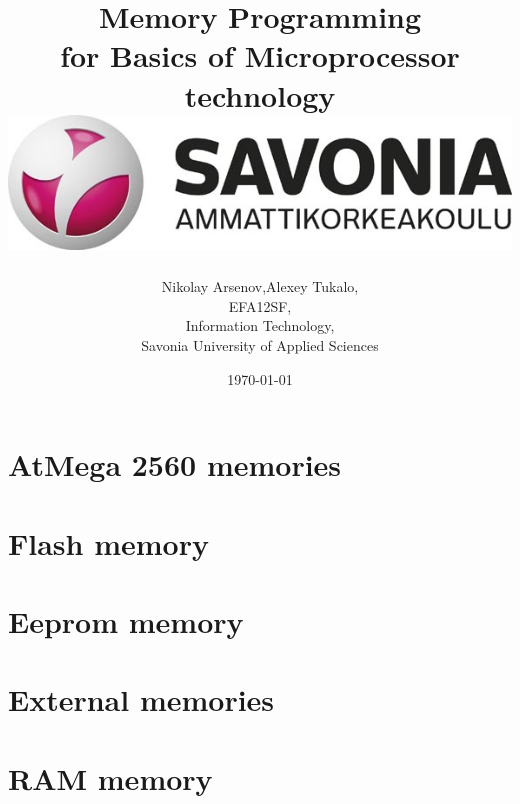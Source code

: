 \documentclass[english]{article}
\date{}
\begin{document}
\title{\vspace{2in}Memory Programming\\
\small for Basics of Microprocessor technology\\
\vspace{0.5in}\includegraphics{savonia.jpg}}

\nopagebreak
\maketitle


\vspace{3in}

\author{
\begin{flushright}
Nikolay Arsenov,Alexey Tukalo,\\
EFA12SF,\\
Information Technology,\\
Savonia University of Applied Sciences
\end{flushright}
}

\date{\today}
\thispagestyle{empty}

\newpage
\setcounter{page}{1}
\setcounter{tocdepth}{2}
\tableofcontents

\newpage

\section{AtMega 2560 memories}

\section{Flash memory}

\section{Eeprom memory}

\section{External memories}

\section{RAM memory}
\end{document}
